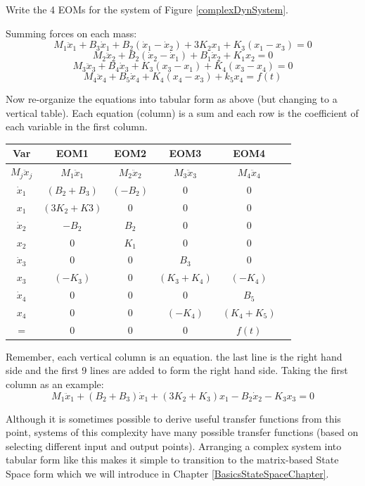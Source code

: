 \begin{Example}
  Write the 4 EOMs for the system of Figure \ref{complexDynSystem}.

Summing forces on each mass:
\[
M_1\ddot{x}_1 + B_3\dot{x}_1+B_2(\dot{x}_1-\dot{x}_2) +3K_2x_1+K_3(x_1-x_3)  = 0
\]
\[
M_2\ddot{x}_2 + B_2(\dot{x}_2-\dot{x}_1)+B_1\dot{x}_2+K_1x_2 = 0
\]
\[
M_3\ddot{x}_3 + B_4\dot{x}_3+K_3(x_3-x_1)+K_4(x_3-x_4)=0
\]
\[
M_4\ddot{x}_4+B_5\dot{x}_4+K_4(x_4-x_3)+k_5x_4 = f(t)
\]


Now re-organize the equations into tabular form as above (but changing to a vertical table).   Each equation (column) is a sum and each row is the coefficient of
each variable in the first column.

\begin{tabular}{|c|c|c|c|c|c|}\hline
  Var           & EOM1 & EOM2 & EOM3 & EOM4\\\hline
  $M_j\ddot{x}_j$  & $M_1\ddot{x}_1$&$M_2\ddot{x}_2$&$M_3\ddot{x}_3$ &$M_4\ddot{x}_4$ \\ \hline
  $\dot{x}_1$   & $(B_2+B_3)$ &$(-B_2)$  & 0           & 0 \\ \hline
        $x_1$   & $(3K_2+K3)$ &0         & 0           & 0 \\ \hline
  $\dot{x}_2$   & $-B_2$      & $B_2$    & 0           & 0 \\ \hline
        $x_2$   & 0           & $K_1$    & 0           & 0 \\ \hline
  $\dot{x}_3$   & 0           & 0        & $B_3$       & 0 \\ \hline
        $x_3$   & $(-K_3)$    & 0        & $(K_3+K_4)$ & $(-K_4)$ \\ \hline
  $\dot{x}_4$   & 0           & 0        & 0           & $B_5$    \\ \hline
        $x_4$   & 0           & 0        & $(-K_4)$    & $(K_4+K_5)$ \\ \hline\hline
        =       & 0  & 0  & 0 & $f(t)$ \\ \hline
\end{tabular}


Remember, each vertical column is an equation.  the last line is the right
hand side and the first 9 lines are added to form the right hand side.
Taking the first column as an example:
\[
M_1\ddot{x}_1+(B_2+B_3)\dot{x}_1+(3K_2+K_3)x_1-B_2\dot{x}_2 -K_3x_3 = 0
\]

\end{Example}

Although it is sometimes possible to derive useful transfer functions from
this point, systems of this complexity have many possible transfer functions
(based on selecting different input and output points).
Arranging a complex
system into tabular form like this makes it simple to transition to
the matrix-based State Space form which we will introduce in Chapter
\ref{BasicsStateSpaceChapter}.

